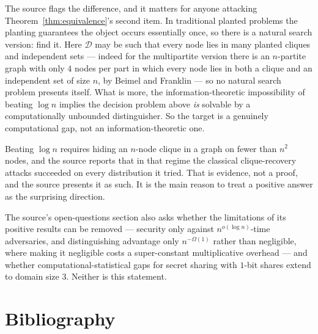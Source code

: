 \documentclass{aicr-conjecture}
\newcommand{\Om}{\Omega}
\begin{document}
\begin{remark}\label{rem:search}
The source flags the difference, and it matters for anyone attacking
Theorem~\ref{thm:equivalence}'s second item. In traditional planted
problems the planting guarantees the object occurs essentially once, so
there is a natural search version: find it. Here $\mathcal{D}$ may be such
that every node lies in many planted cliques and independent sets ---
indeed for the multipartite version there is an $n$-partite graph with
only $4$ nodes per part in which every node lies in both a clique and an
independent set of size $n$, by Beimel and Franklin --- so no natural search
problem presents itself. What is more, the information-theoretic
impossibility of beating $\log n$ implies the decision problem above
\emph{is} solvable by a computationally unbounded distinguisher. So the
target is a genuinely computational gap, not an information-theoretic one.
\end{remark}

\begin{remark}
Beating $\log n$ requires hiding an $n$-node clique in a graph on fewer
than $n^{2}$ nodes, and the source reports that in that regime the
classical clique-recovery attacks succeeded on every distribution it
tried. That is evidence, not a proof, and the source presents it as such.
It is the main reason to treat a positive answer as the surprising
direction.
\end{remark}

\begin{remark}
The source's open-questions section also asks whether the limitations of
its positive results can be removed --- security only against
$n^{o(\log n)}$-time adversaries, and distinguishing advantage only
$n^{-\Om(1)}$ rather than negligible, where making it negligible costs a
super-constant multiplicative overhead --- and whether computational-statistical
gaps for secret sharing with $1$-bit shares extend to domain size $3$.
Neither is this statement.
\end{remark}

\section{Bibliography}
\end{document}
